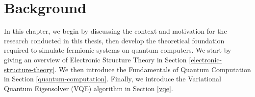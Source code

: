 \chapter{Background}%
\label{background}

In this chapter, we begin by discussing the context and motivation for the research conducted in this thesis, then develop the theoretical foundation required to simulate fermionic systems on quantum computers. We start by giving an overview of Electronic Structure Theory in Section \ref{electronic-structure-theory}. We then introduce the Fundamentals of Quantum Computation in Section \ref{quantum-computation}. Finally, we introduce the Variational Quantum Eigensolver (VQE) algorithm in Section \ref{vqe}.

